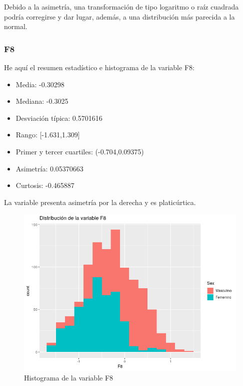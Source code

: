 Debido a la asimetría, una transformación de tipo logaritmo o raíz cuadrada podría corregirse y dar lugar, además, a una distribución más parecida a la normal.

\subsubsection{F8}

He aquí el resumen estadístico e histograma de la variable F8:

\begin{itemize}
	\item Media: -0.30298
	\item Mediana: -0.3025
	\item Desviación típica: 0.5701616
	\item Rango: [-1.631,1.309]
	\item Primer y tercer cuartiles: (-0.704,0.09375)
	\item Asimetría: 0.05370663
	\item Curtosis: -0.465887
\end{itemize}


La variable presenta asimetría por la derecha y es platicúrtica.

\begin{figure}[H] %
	\centering
	\includegraphics[scale=0.6]{dist-F8.png}  %
	\caption{Histograma de la variable F8} 
	\label{fig:hist-F8}
\end{figure}

